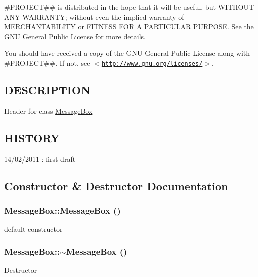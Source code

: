 \#PROJECT\#\# is distributed in the hope that it will be useful, but WITHOUT ANY WARRANTY; without even the implied warranty of MERCHANTABILITY or FITNESS FOR A PARTICULAR PURPOSE. See the GNU General Public License for more details.

You should have received a copy of the GNU General Public License along with \#PROJECT\#\#. If not, see $<$\href{http://www.gnu.org/licenses/}{\tt http://www.gnu.org/licenses/}$>$.\hypertarget{d6/d40/classThread_3_01TM_01_4_DESCRIPTION}{}\subsection{DESCRIPTION}\label{d6/d40/classThread_3_01TM_01_4_DESCRIPTION}
Header for class \hyperlink{classMessageBox}{MessageBox}\hypertarget{d6/d40/classThread_3_01TM_01_4_HISTORY}{}\subsection{HISTORY}\label{d6/d40/classThread_3_01TM_01_4_HISTORY}
14/02/2011 : first draft 

\subsection{Constructor \& Destructor Documentation}
\hypertarget{classMessageBox_adb0c3df8b7a04a515456f0f2bf47321b}{
\subsubsection[{MessageBox}]{\setlength{\rightskip}{0pt plus 5cm}MessageBox::MessageBox ()}}
\label{d2/da3/classMessageBox_adb0c3df8b7a04a515456f0f2bf47321b}
default constructor \hypertarget{classMessageBox_a1db265f45271916de44a4f500ccc566d}{
\subsubsection[{$\sim$MessageBox}]{\setlength{\rightskip}{0pt plus 5cm}MessageBox::$\sim$MessageBox ()}}
\label{d2/da3/classMessageBox_a1db265f45271916de44a4f500ccc566d}
Destructor 

